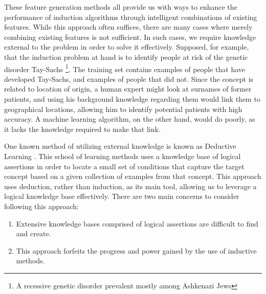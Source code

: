 \documentclass[twoside,11pt]{article}
\theoremstyle{definition}
\begin{document}
These feature generation methods all provide us with ways to enhance the performance of induction algorithms through intelligent combinations of existing features. While this approach often suffices, there are many cases where merely combining existing features is not sufficient. 
In such cases, we require knowledge external to the problem in order to solve it effectively.
Supposed, for example, that the induction problem at hand is to identify people at risk of the genetic disorder Tay-Sachs \footnote{A recessive genetic disorder prevalent mostly among Ashkenazi Jews}. The training set contains examples of people that have developed Tay-Sachs, and examples of people that did not. Since the concept is related to location of origin, a human expert might look at surnames of former patients, and using his background knowledge regarding them would link them to geographical locations, allowing him to identify potential patients with high accuracy.
A machine learning algorithm, on the other hand, would do poorly, as it lacks the knowledge required to make that link.


One known method of utilizing external knowledge is known as Deductive Learning \cite{mitchell1982generalization,dejong1986explanation}. This school of learning methods uses a knowledge base of logical assertions in order to locate a small set of conditions that capture the target concept based on a given collection of examples from that concept. This approach uses deduction, rather than induction, as its main tool, allowing us to leverage a logical knowledge base effectively.
There are two main concerns to consider following this approach:
\begin{enumerate}
	\item Extensive knowledge bases comprised of logical assertions are difficult to find and create.
	\item This approach forfeits the progress and power gained by the use of inductive methods.
\end{enumerate}
\end{document}

